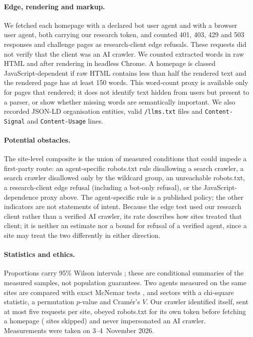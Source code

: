 \documentclass[11pt]{article}
\begin{document}
\paragraph{Edge, rendering and markup.} We fetched each homepage with a declared bot user agent and with a browser
user agent, both carrying our research token, and counted 401, 403, 429 and 503 responses and challenge pages as
research-client edge refusals. These requests did not verify that the client was an AI crawler. We counted extracted
words in raw HTML and after rendering in headless Chrome. A homepage is classed JavaScript-dependent if raw HTML
contains less than half the rendered text and the rendered page has at least 150 words. This word-count proxy is
available only for pages that rendered; it does not identify text hidden from users but present to a parser, or show
whether missing words are semantically important. We also recorded JSON-LD organisation entities, valid
\texttt{/llms.txt} files and \texttt{Content-Signal} and \texttt{Content-Usage} lines.

\paragraph{Potential obstacles.} The site-level composite is the union of measured conditions that could impede a
first-party route: an agent-specific robots.txt rule disallowing a search crawler, a search crawler disallowed only by
the wildcard group, an unreachable robots.txt, a research-client edge refusal (including a bot-only refusal), or the
JavaScript-dependence proxy above. The agent-specific rule is a published policy; the other indicators are not
statements of intent. Because the edge test used our research client rather than a verified AI crawler, its rate
describes how sites treated that client; it is neither an estimate nor a bound for refusal of a verified agent, since a
site may treat the two differently in either direction.

\paragraph{Statistics and ethics.} Proportions carry 95\% Wilson intervals \citep{wilson1927}; these are conditional
summaries of the measured samples, not population guarantees. Two agents measured on the same sites are compared with
exact McNemar tests \citep{mcnemar1947}, and sectors with a chi-square statistic, a permutation $p$-value and
Cram\'er's $V$. Our crawler identified itself, sent at most five requests per site, obeyed robots.txt for its own token
before fetching a homepage (\NSkipped{} sites skipped) and never impersonated an AI crawler. Measurements were taken on
3--4~November 2026.
\end{document}
